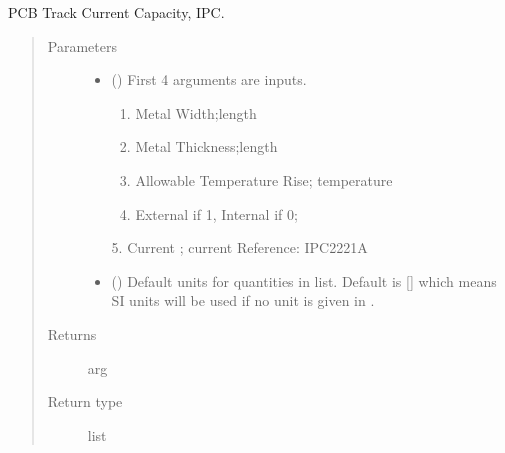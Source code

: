 \documentclass[letterpaper,10pt,english]{sphinxmanual}
\begin{document}

\begin{fulllineitems}
\label{\detokenize{components:components.PCBTrackCurrentCapacityIPC}}
PCB Track Current Capacity, IPC.
\begin{quote}\begin{description}
\item[{Parameters}] \leavevmode\begin{itemize}
\item {} 
 () \textendash{} 
First 4 arguments are inputs.
\begin{enumerate}
%
\item {} 
Metal Width;length

\item {} 
Metal Thickness;length

\item {} 
Allowable Temperature Rise; temperature

\item {} 
External if 1, Internal if 0;

\end{enumerate}

5. Current ; current
Reference:  IPC2221A


\item {} 
 (\sphinxstyleliteralemphasis{\sphinxupquote{, }}) \textendash{} Default units for quantities in  list. Default is {[}{]} which means SI units will be used if no unit is given in .

\end{itemize}

\item[{Returns}] \leavevmode
arg

\item[{Return type}] \leavevmode
list

\end{description}\end{quote}

\end{fulllineitems}
\end{document}
